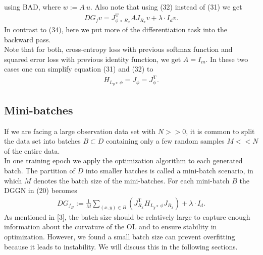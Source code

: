\documentclass[conference]{IEEEtran}
\begin{document}
using BAD, where $w := A\:u$. Also note that using (32) instead of (31) we get
\begin{align}
	DG_{f}v  = J_{\phi\:\circ\:R _{x}}^{\mathrm{T}}AJ_{R _{x}}v + \lambda\cdot I_{d}v.
\end{align}
In contrast to (34), here we put more of the differentiation task into the backward pass.\\
Note that for both, cross-entropy loss with previous softmax function and squared error loss with previous identity function, we get $A = I_{m}$. In these two cases one can simplify equation (31) and (32) to
\begin{align}
	H_{L_{y}\circ\:\phi} = J_{\phi} = J_{\phi}^{\mathrm{T}}.
\end{align}

\subsection{Mini-batches}
\noindent
If we are facing a large observation data set with $N>>0$, it is common to split the data set into batches $B\subset D$ containing only a few random samples $M<<N$ of the entire data. \\
In one training epoch we apply the optimization algorithm to each generated batch. The partition of $D$ into smaller batches is called a mini-batch scenario, in which $M$ denotes the batch size of the mini-batches. For each mini-batch $B$ the DGGN in (20) becomes
\begin{align}
	DG_{f_{B}} := \frac{1}{M}\sum_{(x, y)\in B}^{}\left(J_{R_{x}}^{\mathrm{T}}H_{L_{y}\circ\:\phi}J_{R_{x}}\right) + \lambda\cdot I_{d}.
\end{align}
As mentioned in [3], the batch size should be relatively large to capture enough information about the curvature of the OL and to ensure stability in optimization. However, we found a small batch size can prevent overfitting because it leads to instability. 
We will discuss this in the following sections.
\end{document}
